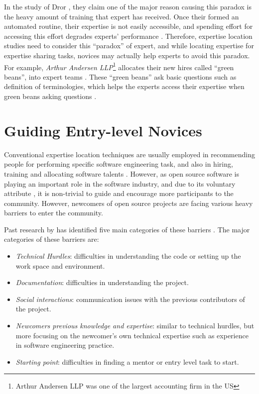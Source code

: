 In the study of Dror \cite{dror2011paradox}, they claim one of the major reason causing this paradox is the heavy amount of training that expert has received. Once their formed an automated routine, their expertise is not easily accessible, and spending effort for accessing this effort degrades experts' performance \cite{flegal2008overthinking}. Therefore, expertise location studies need to consider this ``paradox'' of expert, and while locating expertise for expertise sharing tasks, novices may actually help experts to avoid this paradox. For example, \textit{Arthur Andersen LLP}\footnote{Arthur Andersen LLP was one of the largest accounting firm in the US} allocates their new hires called ``green beans'', into expert teams \cite{greenbeans}. These ``green beans'' ask basic questions such as definition of terminologies, which helps the experts access their expertise when green beans asking questions \cite{kelly2009leadership}.

\section{Guiding Entry-level Novices}

Conventional expertise location techniques are usually employed in recommending people for performing specific software engineering task, and also in hiring, training and allocating software talents \cite{bergersen2014construction}. However, as open source software is playing an important role in the software industry,  and due to its voluntary attribute \cite{shah2006motivation}, it is non-trivial to guide and encourage more participants to the community. However, newcomers of open source projects are facing various heavy barriers to enter the community.

Past research by \citeauthor{STEINMACHER201567} has identified five main categories of these barriers \cite{STEINMACHER201567}. The major categories of these barriers are:

\begin{itemize}
    \item \textit{Technical Hurdles}: difficulties in understanding the code or setting up the work space and environment.
    \item \textit{Documentation}: difficulties in understanding the project.
    \item \textit{Social interactions}: communication issues with the previous contributors of the project.
    \item \textit{Newcomers previous knowledge and expertise}: similar to technical hurdles, but more focusing on the newcomer's own technical expertise such as experience in software engineering practice.
    \item \textit{Starting point}: difficulties in finding a mentor or entry level task to start.
\end{itemize}


